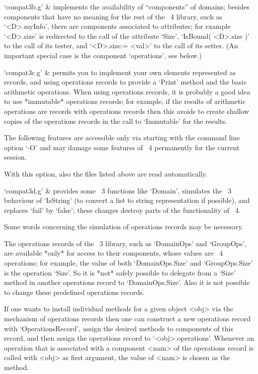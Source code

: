 `compat3b.g' &
    implements the availability of ``components'' of domains;
    besides components that have no meaning for the rest of the {\GAP}~4
    library, such as `<D>.myInfo', there are components associated to
    attributes; for example `<D>.size' is redirected to the call of the
    attribute `Size', `IsBound( <D>.size )' to the call of its tester,
    and `<D>.size:= <val>' to the call of its setter.
    (An important special case is the component `operations', see below.)

`compat3c.g' &
    permits you to implement your own elements represented as records,
    and using operations records to provide a `Print' method and
    the basic arithmetic operations.
    When using operations records, it is probably a good idea to
    use *immutable* operations records; for example, if the results
    of arithmetic operations are records with operations records then
    this avoids to create shallow copies of the operations records 
    in the call to `Immutable' for the results.
\enditems

The following features are accessible only via starting {\GAP} with
the command line option `-O' and may damage some features of {\GAP}~4
permanently for the current session. 

 With this option, also the files listed above are read automatically.

\beginitems
`compat3d.g' &
    provides some {\GAP}~3 functions like `Domain', simulates the
    {\GAP}~3 behaviour of `IsString' (to convert a list to string
    representation if possible), and replaces `fail' by `false';
    these changes destroy parts of the functionality of {\GAP}~4.
\enditems

Some words concerning the simulation of operations records may be
necessary.

The operations records of the {\GAP}~3 library, such as `DomainOps'
and `GroupOps', are available *only* for access to their components,
whose values are {\GAP}~4 operations; for example, the value of both
`DomainOps.Size' and `GroupOps.Size' is the operation `Size'.  So it
is *not* safely possible to delegate from a `Size' method in another
operations record to `DomainOps.Size'.  Also it is not possible to
change these predefined operations records.

If one wants to install individual methods for a given object <obj>
via the mechanism of operations records then one can construct a new
operations record with `OperationsRecord', assign the desired methods
to components of this record, and then assign the operations record to
`<obj>.operations'.  Whenever an operation that is associated with a
component <nam> of the operations record is called with <obj> as first
argument, the value of <nam> is chosen as the method.

